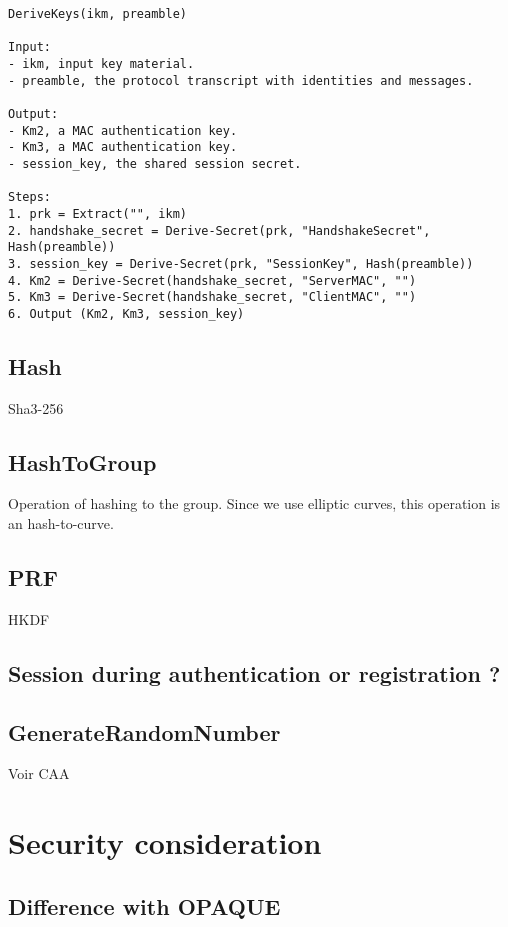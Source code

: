 \documentclass[../report.tex]{subfiles}
\begin{document}
\begin{verbatim}
DeriveKeys(ikm, preamble)

Input:
- ikm, input key material.
- preamble, the protocol transcript with identities and messages.

Output:
- Km2, a MAC authentication key.
- Km3, a MAC authentication key.
- session_key, the shared session secret.

Steps:
1. prk = Extract("", ikm)
2. handshake_secret = Derive-Secret(prk, "HandshakeSecret", Hash(preamble))
3. session_key = Derive-Secret(prk, "SessionKey", Hash(preamble))
4. Km2 = Derive-Secret(handshake_secret, "ServerMAC", "")
5. Km3 = Derive-Secret(handshake_secret, "ClientMAC", "")
6. Output (Km2, Km3, session_key)
\end{verbatim}


\subsection{Hash}
Sha3-256

\subsection{HashToGroup}
Operation of hashing to the group. Since we use elliptic curves, this operation is an hash-to-curve.


\subsection{PRF}
HKDF

\subsection{Session during authentication or registration ?}


\subsection{GenerateRandomNumber}
Voir CAA





\section{Security consideration}

\subsection{Difference with OPAQUE} %
\end{document}

